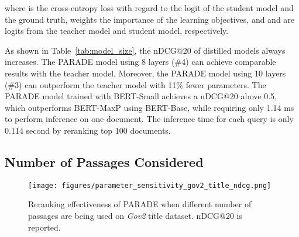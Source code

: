\documentclass[11pt,a4paper]{article}
\begin{document}
where  is the cross-entropy loss with regard to the logit of the student model and the ground truth, 
weights the importance of the learning objectives, and
 and  are logits from the teacher model and student model, respectively.


As shown in Table~\ref{tab:model_size}, the nDCG@20 of distilled models always increases.
The PARADE model using 8 layers (\#4) can achieve comparable results with the teacher model.
Moreover, the PARADE model using 10 layers (\#3) can  outperform the teacher model with 11\% fewer parameters.
The PARADE model trained with BERT-Small achieves a nDCG@20 above 0.5, which outperforms BERT-MaxP using BERT-Base, while
requiring only 1.14 ms to perform inference on one document.
The inference time for each query is only 0.114 second by reranking top 100 documents.



\subsection{Number of Passages Considered} \label{sec.numPassages}

\begin{figure}[tb]
    \centering
    \texttt{[image: figures/parameter\_sensitivity\_gov2\_title\_ndcg.png]}
    \caption{Reranking effectiveness of PARADE when different number of passages are being used on {\it Gov2} title dataset. nDCG@20 is reported.}
    \label{fig.parameter_sensitivity}
\end{figure}

\begin{table}[tb]
    \centering
    \caption{Reranking effectiveness of PARADE using various preserved data size on {\it GOV2} title dataset. 
    nDCG@20 is reported.
    The indexes of columns and rows are number of passages being used.}
    \label{tab:train_eval}
\end{table}
\end{document}
